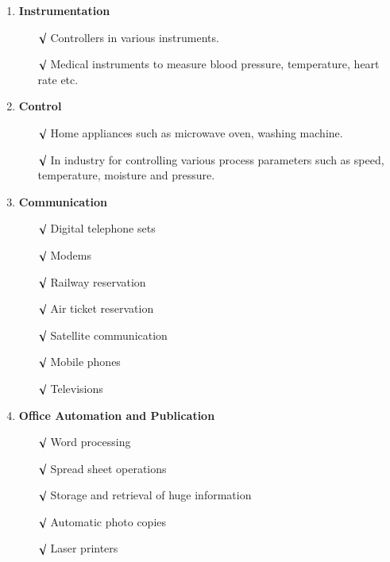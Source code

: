 \begin{enumerate}
\renewcommand{\labelenumi}{\boldmath$\bullet$}
\item {\bf Instrumentation}
\begin{itemize}
\itemsep=4pt
\item[$\surd$] Controllers in various instruments.

\item[$\surd$] Medical instruments to measure blood pressure, temperature, heart rate etc.
\end{itemize}

\item {\bf Control}
\begin{itemize}
\itemsep=4pt
\item[$\surd$] Home appliances such as microwave oven, washing machine.

\item[$\surd$] In industry for controlling various process parameters such as speed, temperature, moisture and pressure.
\end{itemize}

\item {\bf Communication}
\begin{itemize}
\itemsep=6pt
\item[$\surd$] Digital telephone sets

\item[$\surd$] Modems

\item[$\surd$] Railway reservation

\item[$\surd$] Air ticket reservation

\item[$\surd$] Satellite communication

\item[$\surd$] Mobile phones

\item[$\surd$] Televisions
\end{itemize}

\medskip
\item {\bf Office Automation and Publication}
\begin{itemize}
\itemsep=6pt
\item[$\surd$] Word processing

\item[$\surd$] Spread sheet operations

\item[$\surd$] Storage and retrieval of huge information

\item[$\surd$] Automatic photo copies

\item[$\surd$] Laser printers
\end{itemize}
\end{enumerate}

